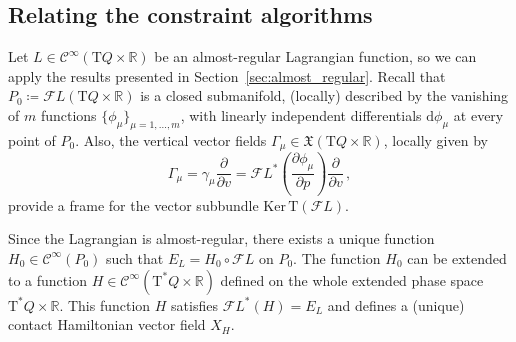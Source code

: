 \documentclass[11pt]{article}
\theoremstyle{plain}
\theoremstyle{definition}
\newcommand{\R}{\mathbb{R}}
\renewcommand{\d}{\mathrm{d}}
\newcommand{\Cinfty}{\mathscr{C}^\infty}
\newcommand{\T}{{\mathrm T}}
\let\Tan\T
\newcommand{\X}{\mathfrak{X}}
\newcommand{\parder}[2]{\frac{\partial #1}{\partial #2}}
\def\d{\mathrm{d}}
\def\X{\mathfrak{X}}
\def\d{\mathrm{d}}
\def\Ker{\mathrm{Ker \,}}
\def\Tan{\mathrm{T}}
\def\FL{\mathcal{F} L}
\begin{document}
\subsection{Relating the constraint algorithms}


Let $L\in \Cinfty (\T Q \times \R)$ be an almost-regular Lagrangian function, so we can apply the results presented in Section~\ref{sec:almost_regular}.
Recall that $P_0 \coloneqq \FL(\Tan Q\times \R)$ is a closed submanifold, (locally) described by the vanishing of $m$ functions $\{\phi_{\mu}\}_{\mu=1,\dots,m}$, with linearly independent differentials $\d \phi_{\mu}$ at every point of $P_0$. Also, the vertical vector fields $\Gamma_{\mu}\in\X(\Tan Q\times \R)$, locally given by
$$\Gamma_{\mu} = \gamma_{\mu}\parder{}{v}=\FL^*\left( \parder{\phi_{\mu}}{p} \right)\parder{}{v}\,,$$
provide a frame for the vector subbundle $\Ker \Tan(\FL)$. 

Since the Lagrangian is almost-regular, there exists a unique function $H_0 \in \Cinfty(P_0)$ such that $E_L = H_0\circ\FL$ on $P_0$. 
The function $H_0$ can be extended to a function $H\in\Cinfty(\Tan^*Q\times \R)$ defined on the whole extended phase space $\Tan^*Q \times \R$. This function $H$ satisfies $\FL^*(H)=E_L$ and defines a (unique) contact Hamiltonian vector field $X_H$.
\end{document}
